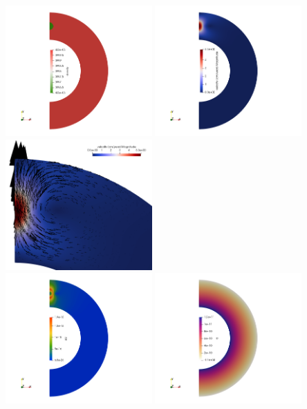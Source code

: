 \begin{center}
\includegraphics[width=5.6cm]{python_codes/fieldstone_152/RESULTS/exp2/rho}
\includegraphics[width=5.6cm]{python_codes/fieldstone_152/RESULTS/exp2/vel}
\includegraphics[width=5.6cm]{python_codes/fieldstone_152/RESULTS/exp2/vel2}\\
\includegraphics[width=5.6cm]{python_codes/fieldstone_152/RESULTS/exp2/sr2}
\includegraphics[width=5.6cm]{python_codes/fieldstone_152/RESULTS/exp2/press}
\end{center}




